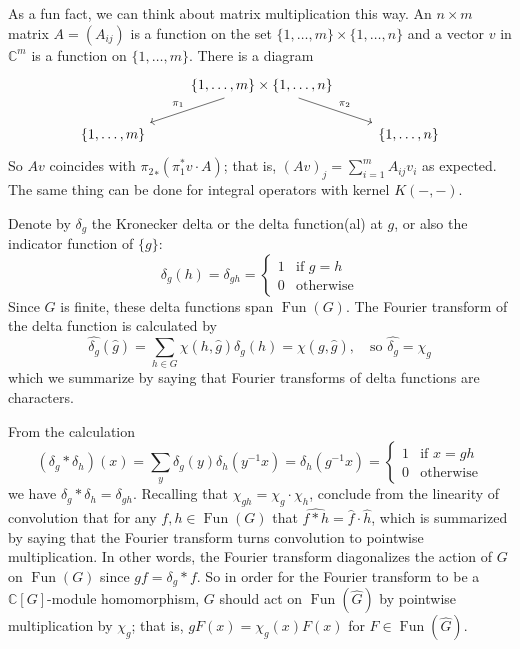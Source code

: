 \documentclass[11pt,leqno]{article}
\theoremstyle{plain}
\theoremstyle{definition}
\numberwithin{equation}{section}
\numberwithin{lem}{section}
\DeclareMathOperator{\Fun}{Fun}
\begin{document}
As a fun fact, we can think about matrix multiplication this way. An $n\times m$ matrix $A = (A_{ij})$ is a function on the set $\{1,\dots,m\}\times\{1,\dots,n\}$ and a vector $v$ in $\mathbb C^m$ is a function on $\{1,\dots,m\}$. There is a diagram 
\[\begin{tikzcd}
	& {\{1,\dots,m\}\times\{1,\dots,n\}} \\
	{\{1,\dots,m\}} && {\{1,\dots,n\}}
	\arrow["{\pi_1}"', from=1-2, to=2-1]
	\arrow["{\pi_2}", from=1-2, to=2-3]
\end{tikzcd}\]
So $Av$ coincides with ${\pi_2}_\ast(\pi_1^\ast v\cdot A)$; that is, $(Av)_j = \sum_{i=1}^m A_{ij}v_i$ as expected. The same thing can be done for integral operators with kernel $K(-,-)$.

Denote by $\delta_g$ the Kronecker delta or the delta function(al) at $g$, or also the indicator function of $\{g\}$:
\[\delta_g(h) = \delta_{gh} = \begin{cases}
	1 & \text{if } g = h\\
	0 & \text{otherwise}
\end{cases}\]
Since $G$ is finite, these delta functions span $\Fun(G)$. The Fourier transform of the delta function is calculated by
\[\widehat{\delta_g}(\hat g) = \sum_{h\in G}\chi(h,\hat g)\delta_g(h) = \chi(g,\hat g), \quad\text{so }\widehat{\delta_g} = \chi_g\]
which we summarize by saying that Fourier transforms of delta functions are characters.

From the calculation 
\[(\delta_g\ast\delta_h)(x) = \sum_{y}\delta_g(y)\delta_h(y^{-1}x) = \delta_h(g^{-1}x) = \begin{cases}
	1 & \text{if } x = gh\\
	0 & \text{otherwise}
\end{cases}\]
we have $\delta_g\ast\delta_h = \delta_{gh}$. Recalling that $\chi_{gh} = \chi_g\cdot \chi_h$, conclude from the linearity of convolution that for any $f,h\in \Fun(G)$ that $\widehat{f\ast h} = \hat f\cdot \hat h$, which is summarized by saying that the Fourier transform turns convolution to pointwise multiplication. In other words, the Fourier transform diagonalizes the action of $G$ on $\Fun(G)$ since $gf = \delta_g\ast f$. So in order for the Fourier transform to be a $\mathbb C[G]$-module homomorphism, $G$ should act on $\Fun(\widehat G)$ by pointwise multiplication by $\chi_g$; that is, $gF(x) = \chi_g(x)F(x)$ for $F\in \Fun(\widehat G)$.
\end{document}
